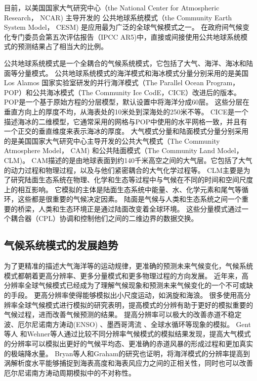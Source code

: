  
目前，以美国国家大气研究中心（the National Center for Atmospheric Research， NCAR) 主导开发的
公共地球系统模式（the Community Earth System Model， CESM) 是应用最为广泛的全球气候模式之一\cite{hurrell2013community}。
在政府间气候变化专门委员会第五次评估报告（IPCC AR5)中，直接或间接使用公共地球系统模式的预测结果占了相当大的比例\cite{stocker2013ipcc}。
 

公共地球系统模式是一个全耦合的气候系统模式，它包括了大气、海洋、海冰和陆面等分量模式。
公共地球系统模式的海洋模式和海冰模式分量分别采用的是美国Los Alamos 国家实验室研发的并行海洋模式（The Parallel Ocean Program，POP）和公共海冰模式（The Community Ice CodE，CICE）改进后的版本\cite{hurrell2013community}。
POP是一个基于原始方程的分层模型，默认设置中将海洋分成60层。
这些分层在垂直方向上的厚度不均，从海表处的10米处到深海处的250米不等。
CICE是一个描述海冰的二维模型，它通常采用的网格与POP中使用的水平网格一致，并且有一个正交的垂直维度来表示海冰的厚度。 
大气模式分量和陆面模式分量分别采用的是美国国家大气研究中心主导开发的公共大气模式（The Community Atmosphere Model， CAM) 和公共陆面模式（The Community Land Model，CLM)。 
CAM描述的是由地球表面到约140千米高空之间的大气层。它包括了大气的动力过程和物理过程，以及与他们紧密耦合的大气化学过程等。
CLM主要是为了研究陆面生态系统在物理、化学和生态等过程中与气候在不同的时间和空间尺度上的相互影响。
它模拟的主体是陆面生态系统中能量、水、化学元素和尾气等循环，这些都是很重要的气候决定因素。
陆面是气候与人类和生态系统之间一个重要的桥梁，人类和生态环境正是通过陆面改变着全球环境。
这些分量模式通过一个耦合器（CPL）协调和控制他们之间的二维边界的数据交换\cite{liu2014c}。

 

\subsection{气候系统模式的发展趋势}

为了更精准的描述大气海洋等的运动规律，更准确的预测未来气候变化，气候系统模式都朝着更高分辨率、更多分量模式和更多物理过程的方向发展\cite{stocker2013ipcc}。
近年来，高分辨率全球气候模式已经成为了理解气候现象和预测未来气候变化的一个不可或缺的手段。
更高分辨率使得能够模拟出小尺度运动，如涡旋和海浪。 
很多使用高分辨率全球气候模式进行模拟的研究表明，提高模式的分辨有助于更好的模拟重要的气候过程，进而改善气候预测的结果。
提高分辨率可以极大的改善赤道不稳定波\citep{roberts2009impact}、厄尔尼诺南方涛动(ENSO) \citep{shaffrey2009uk}、墨西哥湾流\citep{chassignet2008gulf, kuwano2010precipitation} 、全球水循环\citep{demory2014role}等现象的模拟。
Gent等人\cite{gent2010improvements} 和Wehner等人\cite{wehner2014effect}通过比较不同分辨率气候模式的模拟结果发现，提高大气模式的分辨率可以模拟出更好的气候平均态、更准确的赤道风暴的形成过程和更加真实的极端降水量。
Bryan等人\cite{bryan2010frontal}和Graham\cite{graham2014importance}的研究也证明，将海洋模式的分辨率提高到涡解析度水平能够捕捉到海表高度和海表风应力之间的正相关性，同时也可以改善厄尔尼诺南方涛动周期模拟中的不对称性。



